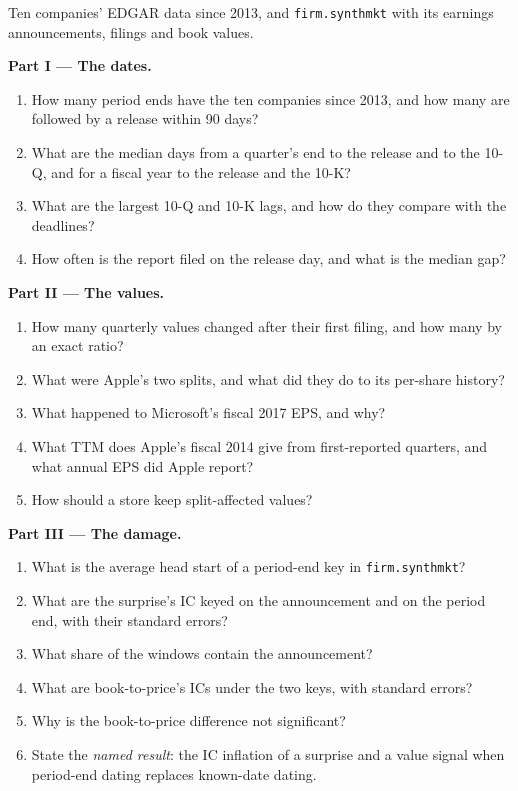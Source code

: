 \begin{problem}\label{pb:rs:fundamental-analyst-and-event-features:1}
Ten companies' EDGAR data since 2013, and \texttt{firm.synthmkt} with its earnings announcements, filings and book values.

\medskip\noindent\textbf{Part I --- The dates.}
\begin{enumerate}
\item How many period ends have the ten companies since 2013, and how many are followed by a release within 90 days?
\item What are the median days from a quarter's end to the release and to the 10-Q, and for a fiscal year to the release and the 10-K?
\item What are the largest 10-Q and 10-K lags, and how do they compare with the deadlines?
\item How often is the report filed on the release day, and what is the median gap?
\end{enumerate}

\medskip\noindent\textbf{Part II --- The values.}
\begin{enumerate}[resume]
\item How many quarterly values changed after their first filing, and how many by an exact ratio?
\item What were Apple's two splits, and what did they do to its per-share history?
\item What happened to Microsoft's fiscal 2017 EPS, and why?
\item What TTM does Apple's fiscal 2014 give from first-reported quarters, and what annual EPS did Apple report?
\item How should a store keep split-affected values?
\end{enumerate}

\medskip\noindent\textbf{Part III --- The damage.}
\begin{enumerate}[resume]
\item What is the average head start of a period-end key in \texttt{firm.synthmkt}?
\item What are the surprise's IC keyed on the announcement and on the period end, with their standard errors?
\item What share of the windows contain the announcement?
\item What are book-to-price's ICs under the two keys, with standard errors?
\item Why is the book-to-price difference not significant?
\item State the \emph{named result}: the IC inflation of a surprise and a value signal when period-end dating replaces known-date dating.
\end{enumerate}


\end{problem}
